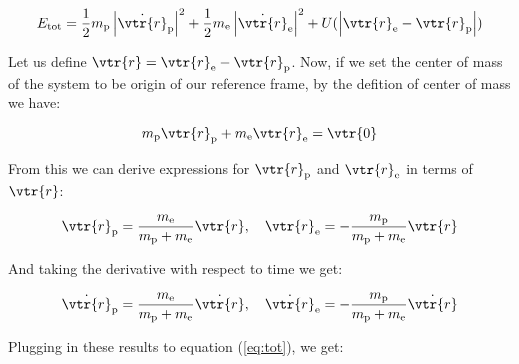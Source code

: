 \documentclass{article}
\begin{document}
    \begin{equation}
        \label{eq:tot}
        E_{\mathrm{tot}} = \frac{1}{2}m_{\mathrm{p}}\left| \dot{\vtr{r}}_{\mathrm{p}} \right|^2 + \frac{1}{2}m_{\mathrm{e}}\left| \dot{\vtr{r}}_{\mathrm{e}} \right|^2 + U(\left| \vtr{r}_{\mathrm{e}} - \vtr{r}_{\mathrm{p}} \right|)
    \end{equation}

    Let us define $\vtr{r} = \vtr{r}_{\mathrm{e}} - \vtr{r}_{\mathrm{p}}$. Now, if we set the center of mass of the system to be origin of our reference frame, by the defition of center of mass we have:

    \begin{equation}
        m_{\mathrm{p}}\vtr{r}_{\mathrm{p}} + m_{\mathrm{e}}\vtr{r}_{\mathrm{e}} = \vtr{0}
    \end{equation}

    From this we can derive expressions for $\vtr{r}_{\mathrm{p}}$ and $\vtr{r}_{\mathrm{e}}$ in terms of $\vtr{r}$:

    \begin{equation}
        \vtr{r}_{\mathrm{p}} = \frac{m_{\mathrm{e}}}{m_{\mathrm{p}} + m_{\mathrm{e}}}\vtr{r}, \quad \vtr{r}_{\mathrm{e}} = -\frac{m_{\mathrm{p}}}{m_{\mathrm{p}} + m_{\mathrm{e}}}\vtr{r}
    \end{equation}

    And taking the derivative with respect to time we get:

    \begin{equation}
        \dot{\vtr{r}}_{\mathrm{p}} = \frac{m_{\mathrm{e}}}{m_{\mathrm{p}} + m_{\mathrm{e}}}\dot{\vtr{r}}, \quad \dot{\vtr{r}}_{\mathrm{e}} = -\frac{m_{\mathrm{p}}}{m_{\mathrm{p}} + m_{\mathrm{e}}}\dot{\vtr{r}}
    \end{equation}

    Plugging in these results to equation (\ref{eq:tot}), we get:
\end{document}
